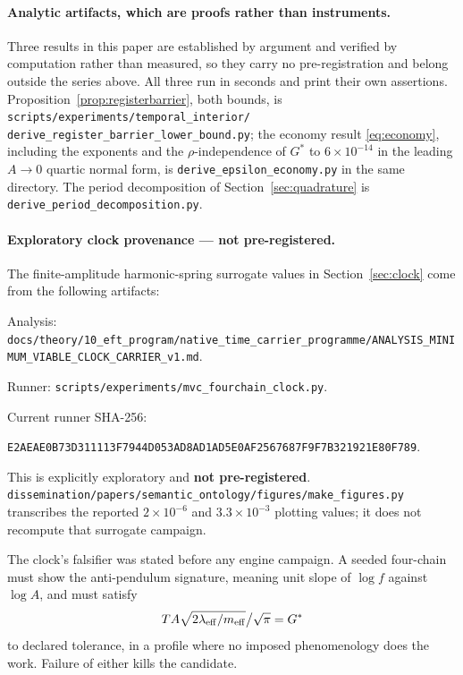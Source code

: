 \documentclass[11pt,a4paper]{article}
\newcommand{\Gstar}{{G^{*}}}
\newcommand{\digest}[2]{\texttt{#1}\allowbreak\texttt{#2}}
\theoremstyle{definition}
\theoremstyle{plain}
\theoremstyle{remark}
\begin{document}
\paragraph{Analytic artifacts, which are proofs rather than instruments.}
Three results in this paper are established by argument and verified by
computation rather than measured, so they carry no pre-registration and
belong outside the series above. All three run in seconds and print their own
assertions. Proposition~\ref{prop:registerbarrier}, both bounds, is
\texttt{scripts/experiments/temporal\_interior/}\allowbreak
\texttt{derive\_register\_barrier\_lower\_bound.py}; the economy result
\eqref{eq:economy}, including the exponents and the $\rho$-independence
of $\Gstar$ to $6\times10^{-14}$ in the leading $A\to0$ quartic normal
form, is
\texttt{derive\_epsilon\_economy.py} in the same directory. The period
decomposition of Section~\ref{sec:quadrature} is
\texttt{derive\_period\_decomposition.py}.

\paragraph{Exploratory clock provenance --- not pre-registered.}
The finite-amplitude harmonic-spring surrogate values in
Section~\ref{sec:clock} come from the following artifacts:

{\footnotesize\raggedright
\noindent Analysis: \nolinkurl{docs/theory/10_eft_program/native_time_carrier_programme/ANALYSIS_MINIMUM_VIABLE_CLOCK_CARRIER_v1.md}.\par
\noindent Runner: \nolinkurl{scripts/experiments/mvc_fourchain_clock.py}.\par
\noindent Current runner SHA-256:\par
\noindent\digest{E2AEAE0B73D311113F7944D053AD8AD1}{AD5E0AF2567687F9F7B321921E80F789}.\par
}
This is explicitly exploratory and \textbf{not pre-registered}.
\nolinkurl{dissemination/papers/semantic_ontology/figures/make_figures.py}
transcribes the reported $2\times10^{-6}$ and $3.3\times10^{-3}$ plotting
values; it does not recompute that surrogate campaign.

\noindent The clock's falsifier was stated before any engine campaign. A
seeded four-chain must show the anti-pendulum signature, meaning unit
slope of $\log f$ against $\log A$, and must satisfy
\[
T A\sqrt{2\lambda_{\rm eff}/m_{\rm eff}}\big/\sqrt{\pi} = \Gstar
\]
to declared tolerance, in a profile where no imposed phenomenology does
the work. Failure of either kills the candidate.
\end{document}

